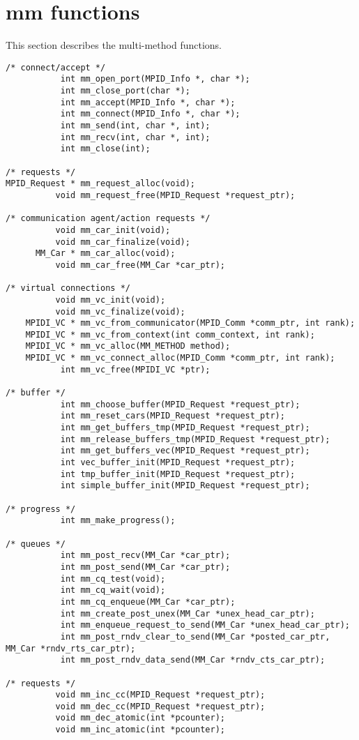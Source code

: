 \documentclass[dvipdfm,twoside,11pt]{article}
\begin{document}
\section{mm functions}
This section describes the multi-method functions.
\begin{verbatim}
/* connect/accept */
           int mm_open_port(MPID_Info *, char *);
           int mm_close_port(char *);
           int mm_accept(MPID_Info *, char *);
           int mm_connect(MPID_Info *, char *);
           int mm_send(int, char *, int);
           int mm_recv(int, char *, int);
           int mm_close(int);

/* requests */
MPID_Request * mm_request_alloc(void);
          void mm_request_free(MPID_Request *request_ptr);

/* communication agent/action requests */
          void mm_car_init(void);
          void mm_car_finalize(void);
      MM_Car * mm_car_alloc(void);
          void mm_car_free(MM_Car *car_ptr);

/* virtual connections */
          void mm_vc_init(void);
          void mm_vc_finalize(void);
    MPIDI_VC * mm_vc_from_communicator(MPID_Comm *comm_ptr, int rank);
    MPIDI_VC * mm_vc_from_context(int comm_context, int rank);
    MPIDI_VC * mm_vc_alloc(MM_METHOD method);
    MPIDI_VC * mm_vc_connect_alloc(MPID_Comm *comm_ptr, int rank);
           int mm_vc_free(MPIDI_VC *ptr);

/* buffer */
           int mm_choose_buffer(MPID_Request *request_ptr);
           int mm_reset_cars(MPID_Request *request_ptr);
           int mm_get_buffers_tmp(MPID_Request *request_ptr);
           int mm_release_buffers_tmp(MPID_Request *request_ptr);
           int mm_get_buffers_vec(MPID_Request *request_ptr);
           int vec_buffer_init(MPID_Request *request_ptr);
           int tmp_buffer_init(MPID_Request *request_ptr);
           int simple_buffer_init(MPID_Request *request_ptr);

/* progress */
           int mm_make_progress();

/* queues */
           int mm_post_recv(MM_Car *car_ptr);
           int mm_post_send(MM_Car *car_ptr);
           int mm_cq_test(void);
           int mm_cq_wait(void);
           int mm_cq_enqueue(MM_Car *car_ptr);
           int mm_create_post_unex(MM_Car *unex_head_car_ptr);
           int mm_enqueue_request_to_send(MM_Car *unex_head_car_ptr);
           int mm_post_rndv_clear_to_send(MM_Car *posted_car_ptr, MM_Car *rndv_rts_car_ptr);
           int mm_post_rndv_data_send(MM_Car *rndv_cts_car_ptr);

/* requests */
          void mm_inc_cc(MPID_Request *request_ptr);
          void mm_dec_cc(MPID_Request *request_ptr);
          void mm_dec_atomic(int *pcounter);
          void mm_inc_atomic(int *pcounter);
\end{verbatim}
\end{document}
